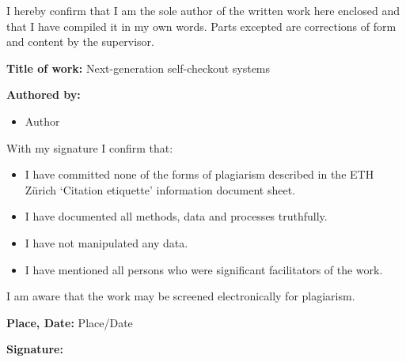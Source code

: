 I hereby confirm that I am the sole author of the written work here enclosed and that I have compiled it
in my own words. Parts excepted are corrections of form and content by the supervisor.

\vspace{5mm}

\noindent\textbf{Title of work:} Next-generation self-checkout systems

\vspace{5mm}

\noindent\textbf{Authored by:} \\
\begin{itemize}
	\item Author
\end{itemize}

\vspace{5mm}

\noindent With my signature I confirm that:
\begin{itemize}
	\item I have committed none of the forms of plagiarism described in the ETH Zürich ‘Citation etiquette’ information document sheet.
	\item I have documented all methods, data and processes truthfully.
	\item I have not manipulated any data.
	\item I have mentioned all persons who were significant facilitators of the work.
\end{itemize}

\noindent I am aware that the work may be screened electronically for plagiarism.

\vspace{5mm}
\noindent \textbf{Place, Date:} Place/Date \\
\vspace{5mm}

\noindent \textbf{Signature:}